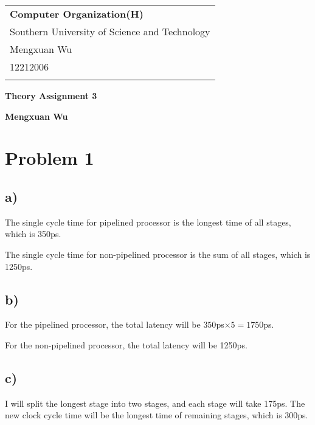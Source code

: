 \documentclass[a4paper,12pt]{article}
\begin{document}
\thispagestyle{empty} %

\begin{tabular}{p{15.5cm}}
{\large \bf Computer Organization(H)} \\
Southern University of Science and Technology \\ Mengxuan Wu \\ 12212006 \\
\hline
\\
\end{tabular}

\vspace*{0.3cm} %

\begin{center}
	{\Large \bf Theory Assignment 3}
	\vspace{2mm}

	{\bf Mengxuan Wu}
		
\end{center}  

\vspace{0.4cm}

\section*{Problem 1}

\subsection*{a)}

The single cycle time for pipelined processor is the longest time of all stages, which is 350ps. 

The single cycle time for non-pipelined processor is the sum of all stages, which is 1250ps.

\subsection*{b)}

For the pipelined processor, the total latency will be $350$ps$ \times 5 = 1750$ps.

For the non-pipelined processor, the total latency will be 1250ps.

\subsection*{c)}

I will split the longest stage into two stages, and each stage will take 175ps.
The new clock cycle time will be the longest time of remaining stages, which is 300ps.
\end{document}
